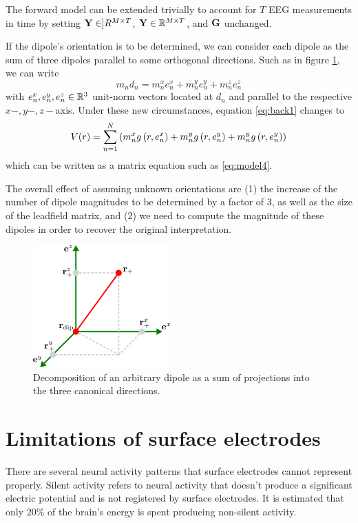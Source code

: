 The forward model can be extended trivially to account for $T$ EEG measurements in time by setting $\mathbf{Y} \in ]R^{M\times T}$, $\mathbf{Y} \in \mathbb{R}^{M\times T}$, and $\mathbf{G}$ unchanged.


If the dipole's orientation is to be determined, we can consider each dipole as the sum of three dipoles parallel to some orthogonal directions. Such as in figure \ref{fig:diagrams3}, we can write
\begin{equation}
m_n d_n = m_n^x e_n^x + m_n^y e_n^y + m_n^z e_n^z
\end{equation}
with $e_n^x, e_n^y, e_n^z \in \mathbb{R}^3$ unit-norm vectors located at $d_n$ and parallel to the respective $x-, y-, z-$axis.
%
Under these new circumstances, equation \eqref{eq:back1} changes to
\begin{equation}
V(r) = 
\sum_{n=1}^N \left( m_n^x g\left( r, e_n^x \right) + m_n^y g\left( r, e_n^y \right) + m_n^y g\left( r, e_n^y \right)
 \right)
\end{equation}
which can be written as a matrix equation such as \eqref{eq:model4}.

The overall effect of assuming unknown orientations are (1) the increase of the number of dipole magnitudes to be determined by a factor of 3, as well as the size of the leadfield matrix, and (2)
we need to compute the magnitude of these dipoles in order to recover the original interpretation.

\begin{figure}
\centering
\includegraphics{./img_dev/OrthDecompOld}
\caption{Decomposition of an arbitrary dipole as a sum of projections into the three canonical directions.}
\label{fig:diagrams3}
\end{figure}

\section{Limitations of surface electrodes}



There are several neural activity patterns that surface electrodes cannot represent properly.
%
Silent activity refers to neural activity that doesn't produce a significant electric potential and is not registered by surface electrodes.
%
It is estimated that only 20\% of the brain's energy is spent producing non-silent activity.

